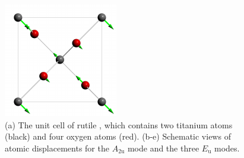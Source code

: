 \begin{figure}[t]
\begin{subcaptionblock}{0.3\linewidth}
\end{subcaptionblock}\hfill
\begin{subcaptionblock}{0.3\linewidth}
\centering
\includegraphics[width=\linewidth]{figures/E3u/E3u.pdf}
\end{subcaptionblock}\hfill
\caption{(a) The unit cell of rutile , which contains two titanium atoms (black) and four oxygen atoms (red). (b-e) Schematic views of atomic displacements for the $A_{\mathrm{2u}}$ mode and the three $E_{\mathrm{u}}$ modes. }
\label{fig:crystal}
\end{figure}